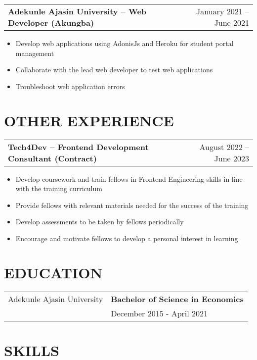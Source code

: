 \documentclass[a4paper,12pt]{article}
\makeatletter
\newenvironment{joblong}[2]
    {
    \begin{tabularx}{\linewidth}{@{}l X r@{}}
    \textbf{#1} & \hfill &  #2 \\[3.75pt]
    \end{tabularx}
    \begin{minipage}[t]{\linewidth}
    \begin{itemize}[nosep,after=\strut, leftmargin=1em, itemsep=3pt,label=--]
    }
    {
    \end{itemize}
    \end{minipage}    
    }
\makeatother
\begin{document}
\begin{joblong}{Adekunle Ajasin University -- Web Developer (Akungba)}{January 2021 -- June 2021}
\item Develop web applications using AdonisJs and Heroku for student portal management
\item Collaborate with the lead web developer to test web applications
\item Troubleshoot web application errors
\end{joblong}

\section{OTHER EXPERIENCE}

\begin{joblong}{Tech4Dev -- Frontend Development Consultant (Contract)}{August 2022 -- June 2023}
\item Develop coursework and train fellows in Frontend Engineering skills in line with the training curriculum
\item Provide fellows with relevant materials needed for the success of the training
\item Develop assessments to be taken by fellows periodically
\item Encourage and motivate fellows to develop a personal interest in learning
\end{joblong}

\section{EDUCATION}

\begin{tabularx}{\linewidth}{@{}l X@{}}
Adekunle Ajasin University & \textbf{Bachelor of Science in Economics} \\
                          & December 2015 - April 2021 \\[10pt]
\end{tabularx}

\section{SKILLS}
\end{document}
